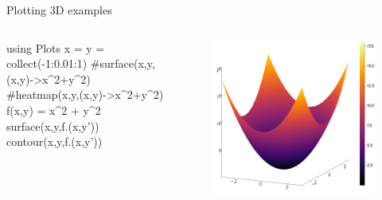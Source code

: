 \documentclass{beamer}
\newenvironment{Boxx}{\begin{tcolorbox}[standard jigsaw, opacityframe=0.8, opacityback=0.0,left=2pt,right=2pt,top=0pt,bottom=0pt]}{\end{tcolorbox}}
\begin{document}
\begin{frame}[fragile]{Plotting 3D examples}
	\begin{columns}
		
		\begin{Boxx}
		\begin{jllisting}
				using Plots
				x = y = collect(-1:0.01:1)
				#surface(x,y,(x,y)->x^2+y^2)
				#heatmap(x,y,(x,y)->x^2+y^2)
				f(x,y) = x^2 + y^2
				surface(x,y,f.(x,y'))
				contour(x,y,f.(x,y'))
			\end{jllisting}
		\end{Boxx}		
		
		
		\begin{figure}
			\centering
			\includegraphics[width=\textwidth]{surf}
		\end{figure}
	\end{columns}
\end{frame}
\end{document}
